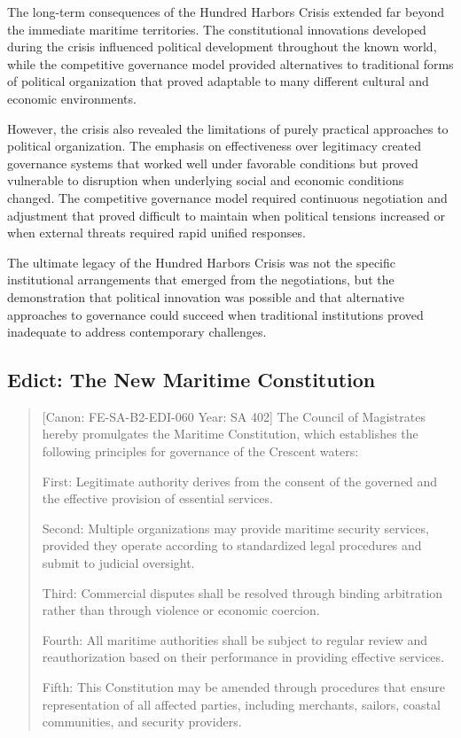The long-term consequences of the Hundred Harbors Crisis extended far
beyond the immediate maritime territories. The constitutional
innovations developed during the crisis influenced political development
throughout the known world, while the competitive governance model
provided alternatives to traditional forms of political organization
that proved adaptable to many different cultural and economic
environments.

However, the crisis also revealed the limitations of purely practical
approaches to political organization. The emphasis on effectiveness over
legitimacy created governance systems that worked well under favorable
conditions but proved vulnerable to disruption when underlying social
and economic conditions changed. The competitive governance model
required continuous negotiation and adjustment that proved difficult to
maintain when political tensions increased or when external threats
required rapid unified responses.

The ultimate legacy of the Hundred Harbors Crisis was not the specific
institutional arrangements that emerged from the negotiations, but the
demonstration that political innovation was possible and that
alternative approaches to governance could succeed when traditional
institutions proved inadequate to address contemporary challenges.

\subsection{Edict: The New Maritime
Constitution}\label{edict-the-new-maritime-constitution-1}

\begin{quote}
{[}Canon: FE-SA-B2-EDI-060 \textbar{} Year: SA 402{]} The Council of
Magistrates hereby promulgates the Maritime Constitution, which
establishes the following principles for governance of the Crescent
waters:

First: Legitimate authority derives from the consent of the governed and
the effective provision of essential services.

Second: Multiple organizations may provide maritime security services,
provided they operate according to standardized legal procedures and
submit to judicial oversight.

Third: Commercial disputes shall be resolved through binding arbitration
rather than through violence or economic coercion.

Fourth: All maritime authorities shall be subject to regular review and
reauthorization based on their performance in providing effective
services.

Fifth: This Constitution may be amended through procedures that ensure
representation of all affected parties, including merchants, sailors,
coastal communities, and security providers.
\end{quote}

